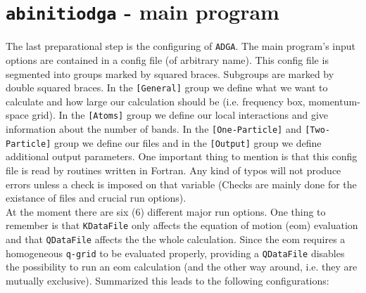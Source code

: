 \documentclass[a4paper,11pt]{article}
\numberwithin{equation}{section} %
\begin{document}
\newpage
\section{\protect\Verb+abinitiodga+ - main program}
The last preparational step is the configuring of \verb+ADGA+.
The main program's input options are contained in a config file (of arbitrary name).
This config file is segmented into groups marked by squared braces.
Subgroups are marked by double squared braces.
In the {\color{red} \verb|[General]|} group we define what we want to calculate
and how large our calculation should be (i.e. frequency box, momentum-space grid).
In the {\color{red} \verb|[Atoms]|} group we define our local interactions and
give information about the number of bands. In the {\color{red} \verb|[One-Particle]|}
and {\color{red} \verb|[Two-Particle]|} group we define our files and in the {\color{red}
\verb|[Output]|} group we define additional output parameters.
One important thing to mention is that this config file is read by routines written in Fortran.
Any kind of typos will not produce errors unless a check is imposed
on that variable (Checks are mainly done for the existance of files and crucial run options).
\\[\baselineskip]
At the moment there are six (6) different major run options.
One thing to remember is that \verb+KDataFile+ only affects the equation of motion (eom)
evaluation and that \verb+QDataFile+ affects the the whole calculation. Since the
eom requires a homogeneous \verb+q-grid+ to be evaluated properly, providing a \verb+QDataFile+
disables the possibility to run an eom calculation (and the other way around, i.e. they are mutually exclusive).
Summarized this leads to the following configurations:
\end{document}
